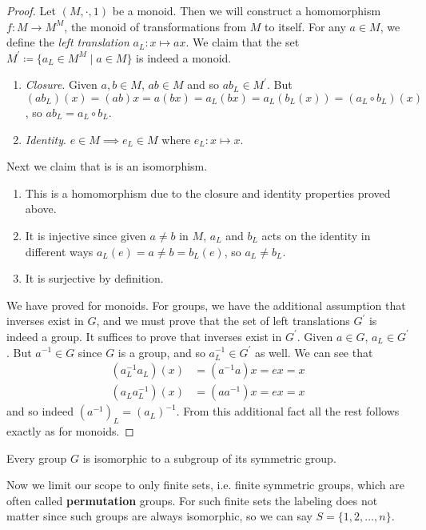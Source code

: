   \begin{proof}
    Let $(M, \cdot, 1)$ be a monoid. Then we will construct a homomorphism $f: M \to M^M$, the monoid of transformations from $M$ to itself. For any $a \in M$, we define the \textit{left translation} $a_L : x \mapsto ax$. We claim that the set $M^\prime \coloneqq \{a_L \in M^M \mid a \in M \}$ is indeed a monoid. 
    \begin{enumerate}
      \item \textit{Closure}. Given $a, b \in M$, $ab \in M$ and so $ab_L \in M^\prime$. But $(ab_L)(x) = (ab)x = a (bx) = a_L (bx) = a_L (b_L (x)) = (a_L \circ b_L)(x)$, so $ab_L = a_L \circ b_L$. 
      \item \textit{Identity}. $e \in M \implies e_L \in M$ where $e_L : x \mapsto x$. 
    \end{enumerate}
    Next we claim that is is an isomorphism. 
    \begin{enumerate}
      \item This is a homomorphism due to the closure and identity properties proved above. 
      \item It is injective since given $a \neq b$ in $M$, $a_L$ and $b_L$ acts on the identity in different ways $a_L(e) = a \neq b = b_L (e)$, so $a_L \neq b_L$. 
      \item It is surjective by definition. 
    \end{enumerate}
    We have proved for monoids. For groups, we have the additional assumption that inverses exist in $G$, and we must prove that the set of left translations $G^\prime$ is indeed a group. It suffices to prove that inverses exist in $G^\prime$. Given $a \in G$, $a_L \in G^\prime$. But $a^{-1} \in G$ since $G$ is a group, and so $a^{-1}_L \in G^\prime$ as well. We can see that 
    \begin{align}
      (a^{-1}_L a_L) (x) & = (a^{-1} a) x = ex = x \\
      (a_L a^{-1}_L) (x) & = (a a^{-1}) x = ex = x
    \end{align}
    and so indeed $(a^{-1})_L = (a_L)^{-1}$. From this additional fact all the rest follows exactly as for monoids. 
  \end{proof}

  \begin{corollary}[Cayley]
    Every group $G$ is isomorphic to a subgroup of its symmetric group. 
  \end{corollary}

  Now we limit our scope to only finite sets, i.e. finite symmetric groups, which are often called \textbf{permutation} groups. For such finite sets the labeling does not matter since such groups are always isomorphic, so we can say $S = \{1, 2, \ldots, n\}$.


